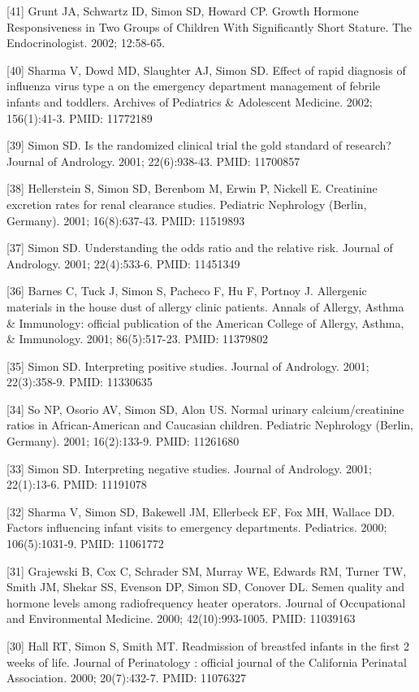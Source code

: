 \documentclass[
  12pt,
]{article}
\begin{document}
{[}41{]} Grunt JA, Schwartz ID, Simon SD, Howard CP. Growth Hormone
Responsiveness in Two Groups of Children With Significantly Short
Stature. The Endocrinologist. 2002; 12:58-65.

{[}40{]} Sharma V, Dowd MD, Slaughter AJ, Simon SD. Effect of rapid
diagnosis of influenza virus type a on the emergency department
management of febrile infants and toddlers. Archives of Pediatrics \&
Adolescent Medicine. 2002; 156(1):41-3. PMID: 11772189

{[}39{]} Simon SD. Is the randomized clinical trial the gold standard of
research? Journal of Andrology. 2001; 22(6):938-43. PMID: 11700857

{[}38{]} Hellerstein S, Simon SD, Berenbom M, Erwin P, Nickell E.
Creatinine excretion rates for renal clearance studies. Pediatric
Nephrology (Berlin, Germany). 2001; 16(8):637-43. PMID: 11519893

{[}37{]} Simon SD. Understanding the odds ratio and the relative risk.
Journal of Andrology. 2001; 22(4):533-6. PMID: 11451349

{[}36{]} Barnes C, Tuck J, Simon S, Pacheco F, Hu F, Portnoy J.
Allergenic materials in the house dust of allergy clinic patients.
Annals of Allergy, Asthma \& Immunology: official publication of the
American College of Allergy, Asthma, \& Immunology. 2001; 86(5):517-23.
PMID: 11379802

{[}35{]} Simon SD. Interpreting positive studies. Journal of Andrology.
2001; 22(3):358-9. PMID: 11330635

{[}34{]} So NP, Osorio AV, Simon SD, Alon US. Normal urinary
calcium/creatinine ratios in African-American and Caucasian children.
Pediatric Nephrology (Berlin, Germany). 2001; 16(2):133-9. PMID:
11261680

{[}33{]} Simon SD. Interpreting negative studies. Journal of Andrology.
2001; 22(1):13-6. PMID: 11191078

{[}32{]} Sharma V, Simon SD, Bakewell JM, Ellerbeck EF, Fox MH, Wallace
DD. Factors influencing infant visits to emergency departments.
Pediatrics. 2000; 106(5):1031-9. PMID: 11061772

{[}31{]} Grajewski B, Cox C, Schrader SM, Murray WE, Edwards RM, Turner
TW, Smith JM, Shekar SS, Evenson DP, Simon SD, Conover DL. Semen quality
and hormone levels among radiofrequency heater operators. Journal of
Occupational and Environmental Medicine. 2000; 42(10):993-1005. PMID:
11039163

{[}30{]} Hall RT, Simon S, Smith MT. Readmission of breastfed infants in
the first 2 weeks of life. Journal of Perinatology : official journal of
the California Perinatal Association. 2000; 20(7):432-7. PMID: 11076327
\end{document}
